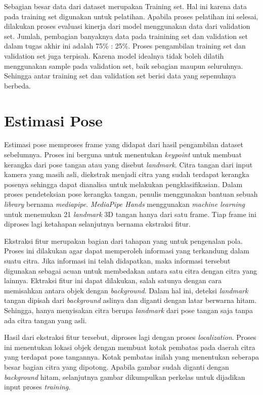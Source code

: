 Sebagian besar data dari dataset merupakan Training set. Hal ini karena data pada training set digunakan untuk pelatihan. Apabila proses pelatihan ini selesai, dilakukan proses evaluasi kinerja dari model menggunakan data dari validation set. Jumlah, pembagian banyaknya data pada trainining set dan validation set dalam tugas akhir ini adalah 75\% : 25\%. Proses pengambilan training set dan validation set juga terpisah. Karena model idealnya tidak boleh dilatih menggunakan sample pada validation set, baik sebagian maupun seluruhnya. Sehingga antar training set dan validation set berisi data yang sepenuhnya berbeda. 

\section{Estimasi Pose}
\label{sec:poseprediction}

Estimasi pose memproses frame yang didapat dari hasil pengambilan dataset sebelumnya. Proses ini berguna untuk menentukan \emph{keypoint} untuk membuat kerangka dari pose tangan atau yang disebut \emph{landmark}. Citra tangan dari input kamera yang masih asli, diekstrak menjadi citra yang sudah terdapat kerangka posenya sehingga dapat dianalisa untuk melakukan pengklasifikasian. Dalam proses pendeteksian pose kerangka tangan, penulis menggunakan bantuan sebuah \emph{library} bernama \emph{mediapipe}. \emph{MediaPipe Hands} menggunakan \emph{machine learning} untuk menemukan 21 \emph{landmark} 3D tangan hanya dari satu frame. Tiap frame ini diproses lagi ketahapan selanjutnya bernama ekstraksi fitur. 

Ekstraksi fitur merupakan bagian dari tahapan yang untuk pengenalan pola. Proses ini dilakukan agar dapat memperoleh informasi yang terkandung dalam suatu citra. Jika informasi ini telah didapatkan, maka informasi tersebut digunakan sebagai acuan untuk membedakan antara satu citra dengan citra yang lainnya. Ektraksi fitur ini dapat dilakukan, salah satunya dengan cara memisahkan antara objek dengan \emph{background}. Dalam hal ini, deteksi \emph{landmark} tangan dipisah dari \emph{background} aslinya dan diganti dengan latar berwarna hitam. Sehingga, hanya menyisakan citra berupa \emph{landmark} dari pose tangan saja tanpa ada citra tangan yang asli.   

Hasil dari ekstraksi fitur tersebut, diproses lagi dengan proses \emph{localization}. Proses ini menentukan lokasi objek dengan membuat kotak pembatas pada daerah citra yang terdapat pose tangannya. Kotak pembatas inilah yang menentukan seberapa besar bagian citra yang dipotong. Apabila gambar sudah diganti dengan \emph{background} hitam, selanjutnya gambar dikumpulkan perkelas untuk dijadikan input proses \emph{training}.

